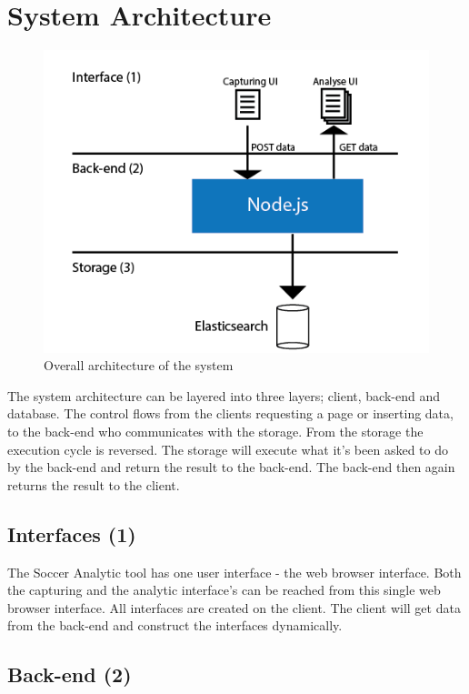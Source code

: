 

\section{System Architecture}

\begin{figure}[ht!]
\centering
\includegraphics[width=1\textwidth]{images/architecture/architecture.png}
\caption{Overall architecture of the system }
\label{overflow}
\end{figure}

The system architecture can be layered into three layers; client, back-end and database. The control flows from the clients requesting a page or inserting data, to the back-end who communicates with the storage. From the storage the execution cycle is reversed. The storage will execute what it’s been asked to do by the back-end and return the result to the back-end. The back-end then again returns the result to the client.

\subsection{Interfaces (1)}

The Soccer Analytic tool has one user interface - the web browser interface. Both the capturing and the analytic interface’s can be reached from this single web browser interface. All interfaces are created on the client. The client will get data from the back-end and construct the interfaces dynamically. 

\subsection{Back-end (2)}

